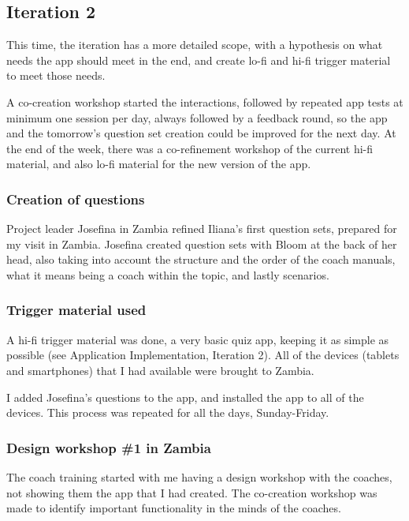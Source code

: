 \subsection{Iteration 2}

This time, the iteration has a more detailed scope, with a hypothesis on what needs the app should meet in the end, and create lo-fi and hi-fi trigger material to meet those needs.

A co-creation workshop started the interactions, followed by repeated app tests at minimum one session per day, always followed by a feedback round, so the app and the tomorrow's question set creation could be improved for the next day. At the end of the week, there was a co-refinement workshop of the current hi-fi material, and also lo-fi material for the new version of the app.

\subsubsection*{Creation of questions}
Project leader Josefina in Zambia refined Iliana's first question sets, prepared for my visit in Zambia. Josefina created question sets with Bloom at the back of her head, also taking into account the structure and the order of the coach manuals, what it means being a coach within the topic, and lastly scenarios.

\subsubsection{Trigger material used}
A hi-fi trigger material was done, a very basic quiz app, keeping it as simple as possible (see Application Implementation, Iteration 2). All of the devices (tablets and smartphones) that I had available were brought to Zambia.

I added Josefina's questions to the app, and installed the app to all of the devices. This process was repeated for all the days, Sunday-Friday.

\subsubsection{Design workshop \#1 in Zambia}
The coach training started with me having a design workshop with the coaches, not showing them the app that I had created. The co-creation workshop was made to identify important functionality in the minds of the coaches.


